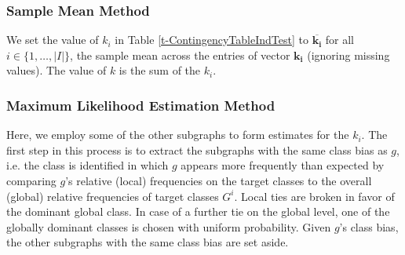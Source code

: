 \documentclass{article}
\begin{document}
\subsubsection{Sample Mean Method}
\label{ss:simple-mean}
We set the value of $k_i$ in Table \ref{t-ContingencyTableIndTest} to
$\overline{\mathbf{k_i}}$ for all $i \in \{1,\ldots,|I|\}$, the sample mean
across the entries of vector $\mathbf{k_i}$ (ignoring missing values). The
value of $k$ is the sum of the $k_i$.

\subsubsection{Maximum Likelihood Estimation Method}
\label{ss:MLE}
Here, we employ some of the other subgraphs to form estimates for the $k_i$.
The first step in this process is to extract the subgraphs with the same class
bias as $g$, i.e. the class is identified in which $g$ appears more frequently
than expected by comparing $g$'s relative (local) frequencies on the target
classes to the overall (global) relative frequencies of target classes $G^i$.
Local ties are broken in favor of the dominant global class. In case of a
further tie on the global level, one of the globally dominant classes is chosen
with uniform probability. Given $g$'s class bias, the other subgraphs with the
same class bias are set aside.
\end{document}
